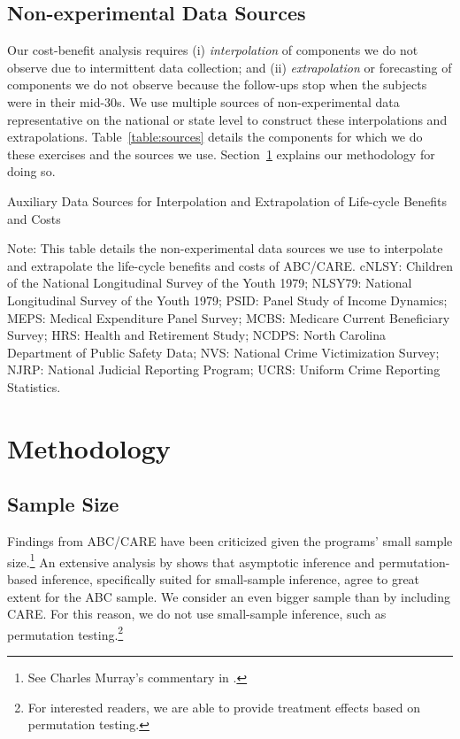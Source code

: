 \subsection{Non-experimental Data Sources}

Our cost-benefit analysis requires (i) \textit{interpolation} of components we do not observe due to intermittent data collection; and (ii) \textit{extrapolation} or forecasting of components we do not observe because the follow-ups stop when the subjects were in their mid-30s. We use multiple sources of non-experimental data representative on the national or state level to construct these interpolations and extrapolations. Table~\ref{table:sources} details the components for which we do these exercises and the sources we use. Section~\ref{section:methodology} explains our methodology for doing so.

\begin{table}[H]
\begin{threeparttable}
\caption{Auxiliary Data Sources for Interpolation and Extrapolation of Life-cycle Benefits and Costs} \label{table:sources}
\footnotesize

\begin{tablenotes}
\footnotesize
Note: This table details the non-experimental data sources we use to interpolate and extrapolate the life-cycle benefits and costs of ABC/CARE. cNLSY: Children of the National Longitudinal Survey of the Youth 1979; NLSY79: National Longitudinal Survey of the Youth 1979; PSID: Panel Study of Income Dynamics; MEPS: Medical Expenditure Panel Survey; MCBS: Medicare Current Beneficiary Survey; HRS: Health and Retirement Study; NCDPS: North Carolina Department of Public Safety Data; NVS: National Crime Victimization Survey; NJRP: National Judicial Reporting Program; UCRS: Uniform Crime Reporting Statistics.
\end{tablenotes}
\end{threeparttable}
\end{table}

\section{Methodology} \label{section:methodology}

\subsection{Sample Size}

Findings from ABC/CARE have been criticized given the programs' small sample size.\footnote{See Charles Murray's commentary in \citep
{Heckman_2013_BOOKGivingkidsfair}.} An extensive analysis by \citet{Campbell_Conti_etal_2014_EarlyChildhoodInvestments} shows that asymptotic inference and permutation-based inference, specifically suited for small-sample inference, agree to great extent for the ABC sample. We consider an even bigger sample than \citet{Campbell_Conti_etal_2014_EarlyChildhoodInvestments} by including CARE. For this reason, we do not use small-sample inference, such as permutation testing.\footnote{For interested readers, we are able to provide treatment effects based on permutation testing.}

